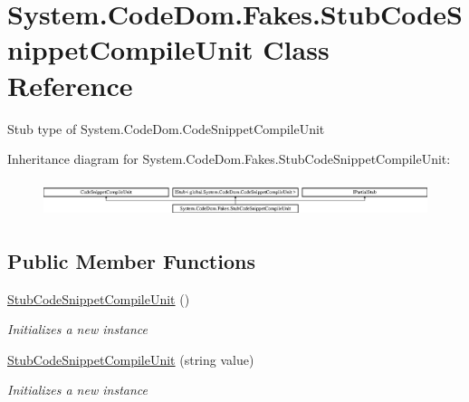 \hypertarget{class_system_1_1_code_dom_1_1_fakes_1_1_stub_code_snippet_compile_unit}{\section{System.\-Code\-Dom.\-Fakes.\-Stub\-Code\-Snippet\-Compile\-Unit Class Reference}
\label{class_system_1_1_code_dom_1_1_fakes_1_1_stub_code_snippet_compile_unit}
}


Stub type of System.\-Code\-Dom.\-Code\-Snippet\-Compile\-Unit 


Inheritance diagram for System.\-Code\-Dom.\-Fakes.\-Stub\-Code\-Snippet\-Compile\-Unit\-:\begin{figure}[H]
\begin{center}
\leavevmode
\includegraphics[height=1.063628cm]{class_system_1_1_code_dom_1_1_fakes_1_1_stub_code_snippet_compile_unit}
\end{center}
\end{figure}
\subsection*{Public Member Functions}
\begin{DoxyCompactItemize}
\item 
\hyperlink{class_system_1_1_code_dom_1_1_fakes_1_1_stub_code_snippet_compile_unit_ac1da0647cca4e6ab6d3fdc60a4207048}{Stub\-Code\-Snippet\-Compile\-Unit} ()
\begin{DoxyCompactList}\small\item\em Initializes a new instance\end{DoxyCompactList}\item 
\hyperlink{class_system_1_1_code_dom_1_1_fakes_1_1_stub_code_snippet_compile_unit_aba5f7fb8ad7ab47720e101dbed54ab35}{Stub\-Code\-Snippet\-Compile\-Unit} (string value)
\begin{DoxyCompactList}\small\item\em Initializes a new instance\end{DoxyCompactList}\end{DoxyCompactItemize}
